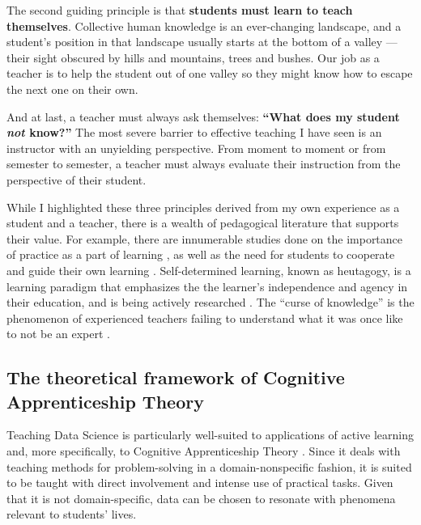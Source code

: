 The second guiding principle is that \textbf{students must learn to teach themselves}. Collective human knowledge is an ever-changing landscape, and a student's position in that landscape usually starts at the bottom of a valley --- their sight obscured by hills and mountains, trees and bushes. Our job as a teacher is to help the student out of one valley so they might know how to escape the next one on their own.

And at last, a teacher must always ask themselves: \textbf{``What does my student \textit{not} know?''} The most severe barrier to effective teaching I have seen is an instructor with an unyielding perspective. From moment to moment or from semester to semester, a teacher must always evaluate their instruction from the perspective of their student.

While I highlighted these three principles derived from my own experience as a student and a teacher, there is a wealth of pedagogical literature that supports their value. For example, there are innumerable studies done on the importance of practice as a part of learning \cite{kang_cultivating_2026,alzen_training_2024,dickson_active_2026,powell_essential_2023,liu_algebra_2025,mikula_framework_2017}, as well as the need for students to cooperate and guide their own learning \cite{suhaimee_self-directed_2025,mercado_self-directed_2024,balan_evaluation_2025,forbes-mckay_exploring_2023,mesghina_cooperative_2024,silverman_selfdirected_1995}. Self-determined learning, known as heutagogy, is a learning paradigm that emphasizes the the learner's independence and agency in their education, and is being actively researched \cite{newfield_heutagogy_2025,panta_heutagogy_nodate}. The ``curse of knowledge'' is the phenomenon of experienced teachers failing to understand what it was once like to not be an expert
\cite{shatz_curse_2023,froyd_faculty_2008}.

\subsection{The theoretical framework of Cognitive Apprenticeship Theory}
Teaching Data Science is particularly well-suited to applications of active learning \cite{bonwell1991active} and, more specifically, to Cognitive Apprenticeship Theory \cite{collins2018cognitive}. Since it deals with teaching methods for problem-solving in a domain-nonspecific fashion, it is suited to be taught with direct involvement and intense use of practical tasks. Given that it is not domain-specific, data can be chosen to resonate with phenomena relevant to students' lives. 

